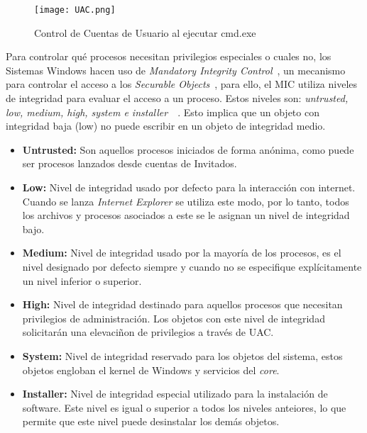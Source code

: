 \begin{figure}[t!] %
\begin{center}
\texttt{[image: UAC.png]}
\end{center}
\caption{Control de Cuentas de Usuario al ejecutar cmd.exe}
\label{UAC}
\end{figure}

Para controlar qué procesos necesitan privilegios especiales o cuales no, los Sistemas Windows hacen uso de {\it Mandatory Integrity Control}~\cite{Capitulo2:MIC}, un mecanismo para controlar el acceso a los {\it Securable Objects}~\cite{Capitulo2:Securable-Objects}, para ello, el MIC utiliza niveles de integridad para evaluar el acceso a un proceso. Estos niveles son: {\it untrusted, low, medium, high, system e installer}~\cite{Capitulo2:IntegrityLabels}~\cite{Capitulo2:IntegrityLabels2}. Esto implica que un objeto con integridad baja (low) no puede escribir en un objeto de integridad medio. \\

\begin{itemize}
\item \textbf{Untrusted:} Son aquellos procesos iniciados de forma anónima, como puede ser procesos lanzados desde cuentas de Invitados.  
\item \textbf{Low:} Nivel de integridad usado por defecto para la interacción con internet. Cuando se lanza {\it Internet Explorer} se utiliza este modo, por lo tanto, todos los archivos y procesos asociados a este se le asignan un nivel de integridad bajo.
\item \textbf{Medium:} Nivel de integridad usado por la mayoría de los procesos, es el nivel designado por defecto siempre y cuando no se especifique explícitamente un nivel inferior o superior.
\item \textbf{High:} Nivel de integridad destinado para aquellos procesos que necesitan privilegios de administración. Los objetos con este nivel de integridad solicitarán una elevaciñon de privilegios a través de UAC.
\item \textbf{System:} Nivel de integridad reservado para los objetos del sistema, estos objetos engloban el kernel de Windows y servicios del {\it core}.
\item \textbf{Installer:} Nivel de integridad especial utilizado para la instalación de software. Este nivel es igual o superior a todos los niveles anteiores, lo que permite que este nivel puede desinstalar los demás objetos. 
\end{itemize}
